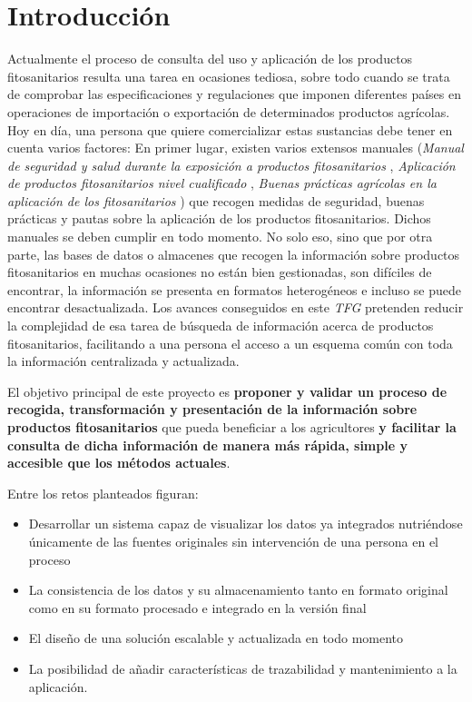 \chapter{Introducción} \label{introduccion}
Actualmente el proceso de consulta del uso y aplicación de los productos fitosanitarios resulta una tarea en ocasiones tediosa, sobre todo cuando se trata de comprobar las especificaciones y regulaciones que imponen diferentes países en operaciones de importación o exportación de determinados productos agrícolas. Hoy en día, una persona que quiere comercializar estas sustancias debe tener en cuenta varios factores: En primer lugar, existen varios extensos manuales (\textit{Manual de seguridad y salud durante la exposición a productos fitosanitarios} \cite{manualseguridad}, \textit{Aplicación de productos fitosanitarios nivel cualificado} \cite{aplicacionfitosanitarios}, \textit{Buenas prácticas agrícolas en la aplicación de los fitosanitarios} \cite{buenaspracticas}) que recogen medidas de seguridad, buenas prácticas y pautas sobre la aplicación de los productos fitosanitarios. Dichos manuales se deben cumplir en todo momento. No solo eso, sino que por otra parte, las bases de datos o almacenes que recogen la información sobre productos fitosanitarios en muchas ocasiones no están bien gestionadas, son difíciles de encontrar, la información se presenta en formatos heterogéneos e incluso se puede encontrar desactualizada. Los avances conseguidos en este \textit{TFG} pretenden reducir la complejidad de esa tarea de búsqueda de información acerca de productos fitosanitarios, facilitando a una persona el acceso a un esquema común con toda la información centralizada y actualizada.\par

El objetivo principal de este proyecto es \textbf{proponer y validar un proceso de recogida, transformación y presentación de la información sobre productos fitosanitarios} que pueda beneficiar a los agricultores \textbf{y facilitar la consulta de dicha información de manera más rápida, simple y accesible que los métodos actuales}. \par
Entre los retos planteados figuran:
\begin{itemize}
\item Desarrollar un sistema capaz de visualizar los datos ya integrados nutriéndose únicamente de las fuentes originales sin intervención de una persona en el proceso
\item La consistencia de los datos y su almacenamiento tanto en formato original como en su formato procesado e integrado en la versión final
\item El diseño de una solución escalable y actualizada en todo momento
\item La posibilidad de añadir características de trazabilidad y mantenimiento a la aplicación.
\end{itemize}

